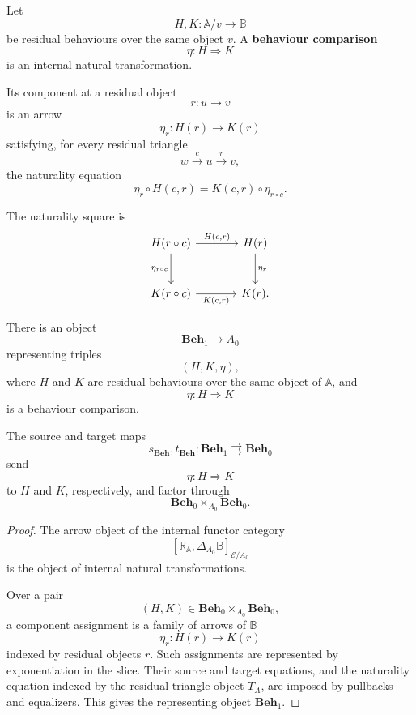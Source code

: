 \begin{definition}
\label{def:behaviour-comparison}
    Let
    \[
        H,K:\mathbb A/v\to\mathbb B
    \]
    be residual behaviours over the same object \(v\). A
    \textbf{behaviour comparison}
    \[
        \eta:H\Rightarrow K
    \]
    is an internal natural transformation.

    Its component at a residual object
    \[
        r:u\to v
    \]
    is an arrow
    \[
        \eta_r:H(r)\to K(r)
    \]
    satisfying, for every residual triangle
    \[
        w\xrightarrow{c}u\xrightarrow{r}v,
    \]
    the naturality equation
    \[
        \eta_r\circ H(c,r)
        =
        K(c,r)\circ\eta_{r\circ c}.
    \]
\end{definition}

The naturality square is
\[
    \begin{tikzcd}[column sep=large, row sep=large]
            H(r\circ c)
                \arrow[r, "{H(c,r)}"]
                \arrow[d, "{\eta_{r\circ c}}"']
        &
            H(r)
                \arrow[d, "{\eta_r}"]
        \\
            K(r\circ c)
                \arrow[r, "{K(c,r)}"']
        &
            K(r).
    \end{tikzcd}
\]

\begin{theorem}
\label{thm:object-of-behaviour-comparisons}
    There is an object
    \[
        \mathbf{Beh}_1\to A_0
    \]
    representing triples
    \[
        (H,K,\eta),
    \]
    where \(H\) and \(K\) are residual behaviours over the same object of
    \(\mathbb A\), and
    \[
        \eta:H\Rightarrow K
    \]
    is a behaviour comparison.

    The source and target maps
    \[
        s_{\mathbf{Beh}},t_{\mathbf{Beh}}:
        \mathbf{Beh}_1\rightrightarrows\mathbf{Beh}_0
    \]
    send
    \[
        \eta:H\Rightarrow K
    \]
    to \(H\) and \(K\), respectively, and factor through
    \[
        \mathbf{Beh}_0\times_{A_0}\mathbf{Beh}_0.
    \]
\end{theorem}
\begin{proof}
    The arrow object of the internal functor category
    \[
        [\mathbb R_{\mathbb A},\Delta_{A_0}\mathbb B]_{\mathcal E/A_0}
    \]
    is the object of internal natural transformations.

    Over a pair
    \[
        (H,K)\in
        \mathbf{Beh}_0\times_{A_0}\mathbf{Beh}_0,
    \]
    a component assignment is a family of arrows of \(\mathbb B\)
    \[
        \eta_r:H(r)\to K(r)
    \]
    indexed by residual objects \(r\). Such assignments are represented by
    exponentiation in the slice. Their source and target equations, and the
    naturality equation indexed by the residual triangle object \(T_A\), are
    imposed by pullbacks and equalizers. This gives the representing object
    \(\mathbf{Beh}_1\).
\end{proof}

